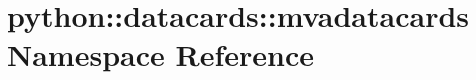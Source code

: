 \hypertarget{namespacepython_1_1datacards_1_1mvadatacards}{
\section{python::datacards::mvadatacards Namespace Reference}
\label{namespacepython_1_1datacards_1_1mvadatacards}
}
